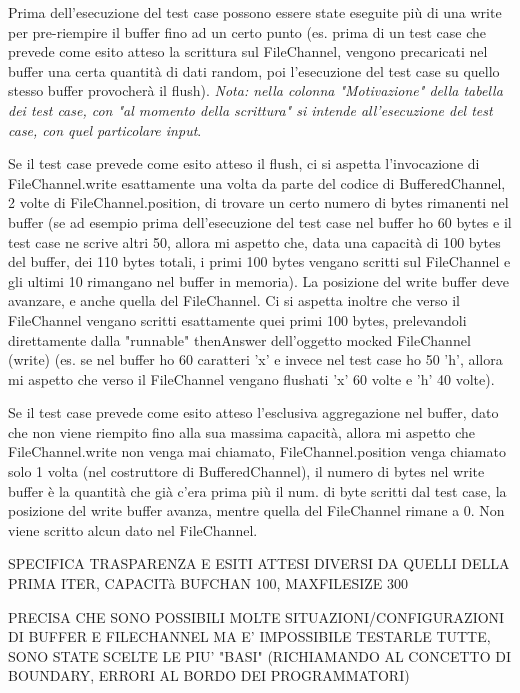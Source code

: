 \documentclass[10pt, a4paper]{article}
\begin{document}
	Prima dell'esecuzione del test case possono essere state eseguite più
	di una write per pre-riempire il buffer fino ad un certo punto (es. prima di un test
	case che prevede come esito atteso la scrittura sul FileChannel, vengono precaricati
	nel buffer una certa quantità di dati random, poi l'esecuzione del test case su quello
	stesso buffer provocherà il flush).
	\textit{Nota: nella colonna "Motivazione" della tabella dei test case, con "al momento della scrittura"
	si intende all'esecuzione del test case, con quel particolare input}.
	
	Se il test case prevede come esito atteso il 
	flush, ci si aspetta l'invocazione di FileChannel.write esattamente una volta
	da parte del codice di BufferedChannel, 2 volte di FileChannel.position, di trovare un certo numero di
	bytes rimanenti nel buffer (se ad esempio prima dell'esecuzione del test case nel buffer ho 60 bytes e
	il test case ne scrive altri 50, allora mi aspetto che, data una capacità di 100 bytes del buffer,
	dei 110 bytes totali, i primi 100 bytes vengano scritti sul FileChannel e gli ultimi 10 rimangano nel
	buffer in memoria). La posizione del write buffer deve avanzare, e anche quella del FileChannel.
	Ci si aspetta inoltre che verso il FileChannel vengano scritti esattamente quei primi 100 bytes,
	prelevandoli direttamente dalla "runnable" thenAnswer dell'oggetto mocked FileChannel (write)
	(es. se nel buffer ho 60 caratteri 'x' e invece nel test case ho 50 'h', allora mi aspetto che verso il
	FileChannel vengano flushati 'x' 60 volte e 'h' 40 volte).
	
	Se il test case prevede come esito atteso l'esclusiva aggregazione nel buffer, dato che non 
	viene riempito fino alla sua massima capacità, allora mi aspetto che FileChannel.write non venga mai chiamato,
	FileChannel.position venga chiamato solo 1 volta (nel costruttore di BufferedChannel), il numero di bytes
	nel write buffer è la quantità che già c'era prima più il num. di byte scritti dal test case, la posizione
	del write buffer avanza, mentre quella del FileChannel rimane a 0. Non viene scritto alcun dato nel
	FileChannel.
	
	SPECIFICA TRASPARENZA E ESITI ATTESI DIVERSI DA QUELLI DELLA PRIMA ITER, CAPACITà BUFCHAN 100, MAXFILESIZE 300
	
	PRECISA CHE SONO POSSIBILI MOLTE SITUAZIONI/CONFIGURAZIONI DI BUFFER E FILECHANNEL MA E' IMPOSSIBILE TESTARLE
	TUTTE, SONO STATE SCELTE LE PIU' "BASI" (RICHIAMANDO AL CONCETTO DI BOUNDARY, 
	ERRORI AL BORDO DEI PROGRAMMATORI)
	
\end{document}
